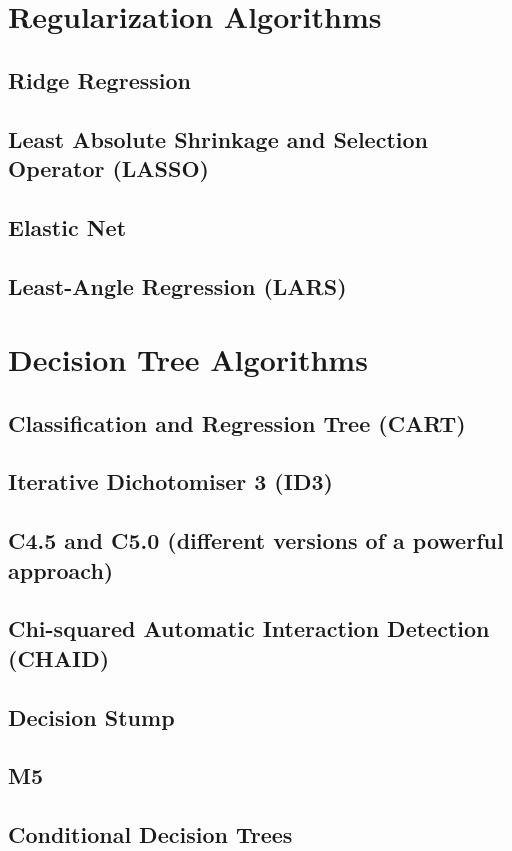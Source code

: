 \documentclass[14pt]{book}
\begin{document}
\chapter{Regularization Algorithms}
\section{Ridge Regression}
\section{Least Absolute Shrinkage and Selection Operator (LASSO)}
\section{Elastic Net}
\section{Least-Angle Regression (LARS)}
\chapter{Decision Tree Algorithms}
\section{Classification and Regression Tree (CART)}
\section{Iterative Dichotomiser 3 (ID3)}
\section{C4.5 and C5.0 (different versions of a powerful approach)}
\section{Chi-squared Automatic Interaction Detection (CHAID)}
\section{Decision Stump}
\section{M5}
\section{Conditional Decision Trees}
\end{document}
